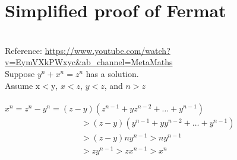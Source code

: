 \documentclass[12pt]{article}
\begin{document}
\section*{Simplified proof of Fermat}
\\
Reference:  \url{https://www.youtube.com/watch?v=EymVXkPWxyc&ab_channel=MetaMaths}
\\
Suppose $y^n+x^n=z^n$ has a solution.
\\
Assume  $\mathrm{x}<\mathrm{y}$, 
$x<z$, $y<z$, 
and $n > z$ 
\\
\\
$x^n=z^n-y^n=(z-y)\left(z^{n-1}+y z^{n-2}+\ldots+y^{n-1}\right)$
\begin{align*} 
&>(z-y)\left(y^{n-1}+y y^{n-2}+\ldots+y^{n-1}\right) \\
&>(z-y) n y^{n-1}>n y^{n-1} \\
&>z y^{n-1}>z x^{n-1}>x^n
\end{align*}
\end{document}
